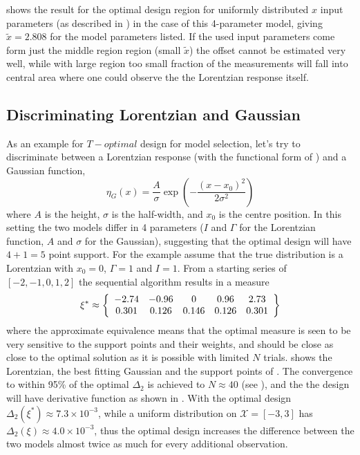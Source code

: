 \documentclass[12pt]{iopart}
\begin{document}
 shows the result for the optimal design region for uniformly distributed $x$ input parameters (as described in ) in the case of this 4-parameter model, giving $\tilde x = 2.808$ for the model parameters listed. If the used input parameters come form just the middle region region (small $\tilde x$) the offset cannot be estimated very well, while with large region too small fraction of the measurements will fall into central area where one could observe the the Lorentzian response itself.

\subsection{Discriminating Lorentzian and Gaussian}

As an example for $T-optimal$ design for model selection, let's try to discriminate between a Lorentzian response (with the functional form of ) and a Gaussian function,
\begin{equation}
\eta_G(x) = \frac{A}{\sigma} \exp\left(-\frac{(x-x_0)^2}{2 \sigma^2}\right)
\label{eq:gauss}
\end{equation}
where $A$ is the height, $\sigma$ is the half-width, and $x_0$ is the centre position. In this setting the two models differ in 4 parameters ($I$ and $\Gamma$ for the Lorentzian function, $A$ and $\sigma$ for the Gaussian), suggesting that the optimal design will have $4+1=5$ point support. For the example assume that the true distribution is a Lorentzian with $x_0 = 0$, $\Gamma = 1$  and $I = 1$. From a starting series of $[-2, -1, 0, 1, 2]$ the sequential algorithm results in a measure
\begin{equation}
\xi^* \approx \left\{
  \begin{array}{c c c c c}
    -2.74 & -0.96 & 0 & 0.96 & 2.73\\
    0.301 & 0.126 & 0.146 & 0.126 & 0.301\\
  \end{array} \right \}
\label{eq:lorgauss}
\end{equation}
where the approximate equivalence means that the optimal measure is seen to be very sensitive to the support points and their weights, and  should be close as close to the optimal solution as it is possible with limited $N$ trials.  shows the Lorentzian, the best fitting Gaussian and the support points of . The convergence to within 95\% of the optimal $\Delta_2$ is achieved to $N \approx 40$ (see ), and the the design will have derivative function as shown in .
With the optimal design $\Delta_2(\xi^*) \approx 7.3 \times 10^{-3}$, while a uniform distribution on $\mathcal{X} = [-3, 3]$ has $\Delta_2(\xi) \approx 4.0 \times 10^{-3}$, thus the optimal design increases the difference between the two models almost twice as much for every additional observation.
\end{document}
